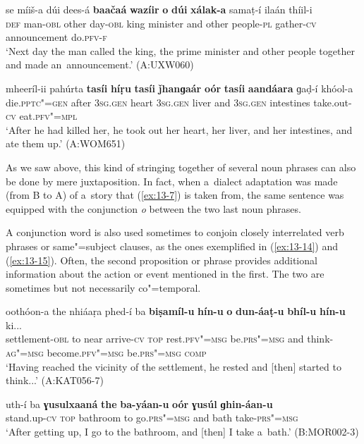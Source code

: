 \begin{exe}
\ex
\label{ex:13-12}
\gll se míiš-a dúi dees-á \textbf{baačaá} \textbf{wazíir} \textbf{o} \textbf{dúi} \textbf{xálak-a} samaṭ-í ilaán thíil-i \\
\textsc{def} man-\textsc{obl} other day-\textsc{obl} king minister and other  people-\textsc{pl} gather-\textsc{cv} announcement do.\textsc{pfv-f}  \\
\glt `Next day the man called the king, the prime minister and other people together and made an~announcement.' (A:UXW060)

\ex
\label{ex:13-13}
\gll mheeríl-ii pahúrta \textbf{tasíi} \textbf{híṛu} \textbf{tasíi} \textbf{ǰhanɡaár} \textbf{oór} \textbf{tasíi} \textbf{aandáara} ɡaḍ-í khóol-a  \\
die.\textsc{pptc"=gen} after \textsc{3sg.gen} heart \textsc{3sg.gen}  liver and \textsc{3sg.gen} intestines take.out-\textsc{cv} eat.\textsc{pfv"=mpl}\\
\glt `After he had killed her, he took out her heart, her liver, and her intestines, and ate them up.' (A:WOM651) 
\end{exe}

As we saw above, this kind of stringing together of several noun phrases can also be done by mere juxtaposition. In fact, when a~dialect adaptation was made (from B to A) of a~story that (\ref{ex:13-7}) is taken from, the same sentence was equipped with the conjunction \textit{o} between the two last noun phrases. 


A conjunction word is also used sometimes to conjoin closely interrelated verb phrases or same"=subject clauses, as the ones exemplified in (\ref{ex:13-14}) and (\ref{ex:13-15}). Often, the second proposition or phrase provides additional information about the action or event mentioned in the first. The two are sometimes but not necessarily co"=temporal.

\begin{exe}
\ex
\label{ex:13-14}
\gll oothóon-a the nhiáaṛa phed-í ba \textbf{biṣamíl-u} \textbf{hín-u} \textbf{o} \textbf{dun-áaṭ-u} \textbf{bhíl-u} \textbf{hín-u} ki...\\
settlement-\textsc{obl} to near arrive-\textsc{cv} \textsc{top} rest.\textsc{pfv"=msg} be.\textsc{prs"=msg} and think-\textsc{ag"=msg} become.\textsc{pfv"=msg} be.\textsc{prs"=msg } \textsc{comp} \\
\glt `Having reached the vicinity of the settlement, he rested and [then] started to think...' (A:KAT056-7)

\ex
\label{ex:13-15}
\gll uth-í ba \textbf{ɣusulxaaná} \textbf{the} \textbf{ba-yáan-u} \textbf{oór} \textbf{ɣusúl} \textbf{ɡhin-áan-u} \\
stand.up-\textsc{cv} \textsc{top} bathroom to go.\textsc{prs"=msg}  and bath take-\textsc{prs"=msg} \\
\glt `After getting up, I go to the bathroom, and [then] I take a~bath.' (B:MOR002-3) 
\end{exe}

